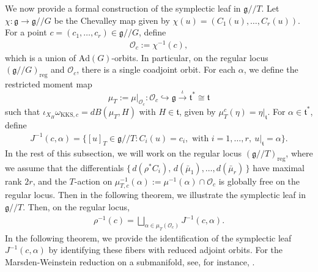 \documentclass[11pt,reqno]{amsart}
\newtheorem*{theorem A}{Main Theorem A}
\newtheorem*{theorem B}{Main Theorem B}
\newtheorem*{theorem C}{Main Theorem C}
\newtheorem*{theorem D}{Main Theorem D}
\theoremstyle{definition}
\theoremstyle{plain}
\theoremstyle{conclusion}
\begin{document}
We now provide a formal construction of the symplectic leaf in $\mathfrak{g}//T$. Let $\chi:\mathfrak{g}\to \mathfrak{g}// G$ be the Chevalley map given by $\chi(u)=(C_1(u),\dots,C_r(u))$. For a point $c=(c_1,\dots,c_r)\in \mathfrak{g}// G$, define
\begin{align*}
 \mathcal{O}_c:=\chi^{-1}(c),
\end{align*} which is a union of $\mathrm{Ad}(G)$-orbits. In particular, on the regular locus $\left( \mathfrak{g}// G\right)_{\mathrm{reg}}$ and $\mathcal{O}_c$, there is a single coadjoint orbit.  For each $\alpha$, we define the restricted moment map $$ \mu_T  := \left.\mu \right\vert_{\mathcal{O}_c}: \mathcal{O}_c \hookrightarrow \mathfrak{g}  \xrightarrow{\ \iota\ } \mathfrak{t}^* \cong \mathfrak{t}$$ such that $\iota_{X_H} \omega_{\mathrm{KKS},c} = d B(\mu_T,H)$ with $H \in \mathfrak{t}$,  given by  $\mu_T^c(\eta)=\eta\vert_{\mathfrak{t}} $. For $\alpha\in\mathfrak{t}^*$, define
\begin{align*}
 J^{-1}(c, \alpha)=\bigl\{[u]_T\in \mathfrak{g}//T:  C_i(u)=c_i, \text{ with } i=1,\dots,r,\ u \vert_{\mathfrak{t}}=\alpha\bigr\}.
\end{align*} In the rest of this subsection, we will work on the regular locus $(\mathfrak{g}//T)_{\mathrm{reg}}$, where we assume that the differentials $\{\,d(\rho^*C_i),\,d(\bar{\mu}_1),\dots,d(\bar{\mu}_r)\,\}$ have maximal rank $2r$, and the $T$-action on $\mu_{T,c}^{-1}(\alpha) := \mu^{-1}(\alpha)\cap\mathcal{O}_c$ is globally free on the regular locus. Then in the following theorem, we illustrate the symplectic leaf in $\mathfrak{g}//T$. %
Then, on the regular locus, \begin{align*}
\rho^{-1}(c) = \bigsqcup_{\alpha\in \mu_T(\mathcal{O}_c)} J^{-1}(c,\alpha).
\end{align*} In the following theorem, we provide the identification of the symplectic leaf $J^{-1}(c,\alpha)$ by identifying these fibers with reduced adjoint orbits. For the Marsden-Weinstein reduction on a submanifold, see, for instance, \cite{MR4497405}.

 
 
\end{document}
